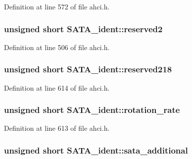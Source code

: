 Definition at line 572 of file ahci.\+h.

\subsubsection[{\texorpdfstring{reserved2}{reserved2}}]{\setlength{\rightskip}{0pt plus 5cm}unsigned short S\+A\+T\+A\+\_\+ident\+::reserved2}\hypertarget{structSATA__ident_a8be69794eccacf473f7c55523dfdd885}{}\label{structSATA__ident_a8be69794eccacf473f7c55523dfdd885}


Definition at line 506 of file ahci.\+h.

\subsubsection[{\texorpdfstring{reserved218}{reserved218}}]{\setlength{\rightskip}{0pt plus 5cm}unsigned short S\+A\+T\+A\+\_\+ident\+::reserved218}\hypertarget{structSATA__ident_a06e5d3fdae8830492b2a8360a229f8d4}{}\label{structSATA__ident_a06e5d3fdae8830492b2a8360a229f8d4}


Definition at line 614 of file ahci.\+h.

\subsubsection[{\texorpdfstring{rotation\+\_\+rate}{rotation_rate}}]{\setlength{\rightskip}{0pt plus 5cm}unsigned short S\+A\+T\+A\+\_\+ident\+::rotation\+\_\+rate}\hypertarget{structSATA__ident_ab28e705ed0d36775a4782ee4d5c37899}{}\label{structSATA__ident_ab28e705ed0d36775a4782ee4d5c37899}


Definition at line 613 of file ahci.\+h.

\subsubsection[{\texorpdfstring{sata\+\_\+additional}{sata_additional}}]{\setlength{\rightskip}{0pt plus 5cm}unsigned short S\+A\+T\+A\+\_\+ident\+::sata\+\_\+additional}\hypertarget{structSATA__ident_ac397fd6793b8efa1f3e3c743ae3ab8d6}{}\label{structSATA__ident_ac397fd6793b8efa1f3e3c743ae3ab8d6}


